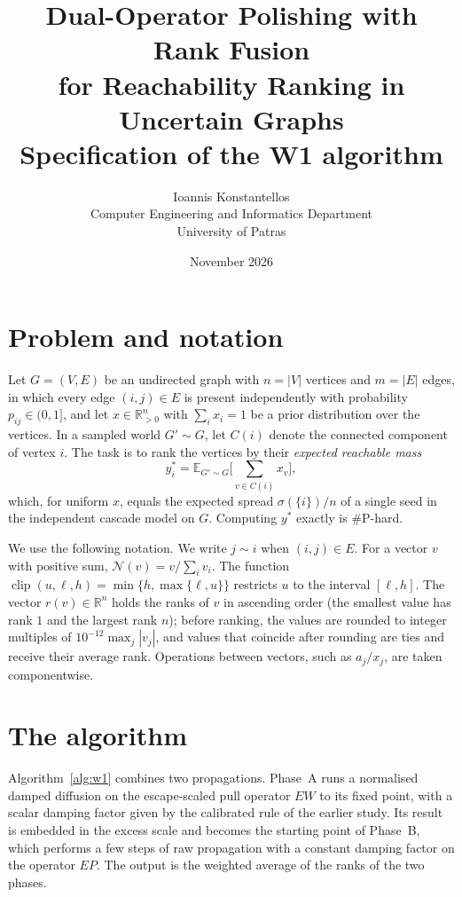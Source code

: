 \documentclass[11pt,a4paper]{article}
\title{\textbf{Dual-Operator Polishing with Rank Fusion\\ for Reachability Ranking in Uncertain Graphs}\\[6pt]
\large Specification of the W1 algorithm}
\author{Ioannis Konstantellos\\[2pt]
\small Computer Engineering and Informatics Department\\
\small University of Patras}
\date{November 2026}
\newcommand{\N}{\mathcal{N}}
\DeclareMathOperator{\clip}{clip}
\begin{document}
\maketitle

\section{Problem and notation}

Let $G=(V,E)$ be an undirected graph with $n=|V|$ vertices and $m=|E|$ edges, in which every edge $(i,j)\in E$ is present independently with probability $p_{ij}\in(0,1]$, and let $x\in\mathbb{R}^n_{>0}$ with $\sum_i x_i=1$ be a prior distribution over the vertices. In a sampled world $G'\sim G$, let $C(i)$ denote the connected component of vertex $i$. The task is to rank the vertices by their \emph{expected reachable mass}
\[
y^*_i=\mathbb{E}_{G'\sim G}\Big[\sum_{v\in C(i)}x_v\Big],
\]
which, for uniform $x$, equals the expected spread $\sigma(\{i\})/n$ of a single seed in the independent cascade model on $G$. Computing $y^*$ exactly is \#P-hard.

We use the following notation. We write $j\sim i$ when $(i,j)\in E$. For a vector $v$ with positive sum, $\N(v)=v/\sum_i v_i$. The function $\clip(u,\ell,h)=\min\{h,\max\{\ell,u\}\}$ restricts $u$ to the interval $[\ell,h]$. The vector $r(v)\in\mathbb{R}^n$ holds the ranks of $v$ in ascending order (the smallest value has rank $1$ and the largest rank $n$); before ranking, the values are rounded to integer multiples of $10^{-12}\max_j|v_j|$, and values that coincide after rounding are ties and receive their average rank. Operations between vectors, such as $a_j/x_j$, are taken componentwise.

\section{The algorithm}

Algorithm~\ref{alg:w1} combines two propagations. Phase~A runs a normalised damped diffusion on the escape-scaled pull operator $EW$ to its fixed point, with a scalar damping factor given by the calibrated rule of the earlier study. Its result is embedded in the excess scale and becomes the starting point of Phase~B, which performs a few steps of raw propagation with a constant damping factor on the operator $EP$. The output is the weighted average of the ranks of the two phases.
\end{document}
